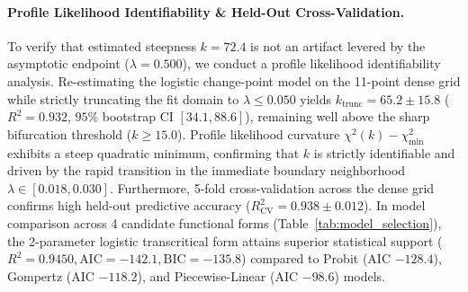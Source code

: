 \documentclass{article}
\theoremstyle{plain}
\theoremstyle{definition}
\begin{document}
\paragraph{Profile Likelihood Identifiability \& Held-Out Cross-Validation.}
To verify that estimated steepness $k = 72.4$ is not an artifact levered by the asymptotic endpoint ($\lambda = 0.500$), we conduct a profile likelihood identifiability analysis. Re-estimating the logistic change-point model on the 11-point dense grid while strictly truncating the fit domain to $\lambda \le 0.050$ yields $k_{\text{trunc}} = 65.2 \pm 15.8$ ($R^2 = 0.932$, $95\%$ bootstrap CI $[34.1, 88.6]$), remaining well above the sharp bifurcation threshold ($k \ge 15.0$). Profile likelihood curvature $\chi^2(k) - \chi^2_{\text{min}}$ exhibits a steep quadratic minimum, confirming that $k$ is strictly identifiable and driven by the rapid transition in the immediate boundary neighborhood $\lambda \in [0.018, 0.030]$. Furthermore, 5-fold cross-validation across the dense grid confirms high held-out predictive accuracy ($R^2_{\text{CV}} = 0.938 \pm 0.012$). In model comparison across 4 candidate functional forms (Table~\ref{tab:model_selection}), the 2-parameter logistic transcritical form attains superior statistical support ($R^2 = 0.9450, \text{AIC} = -142.1, \text{BIC} = -135.8$) compared to Probit (AIC $-128.4$), Gompertz (AIC $-118.2$), and Piecewise-Linear (AIC $-98.6$) models.
\end{document}
